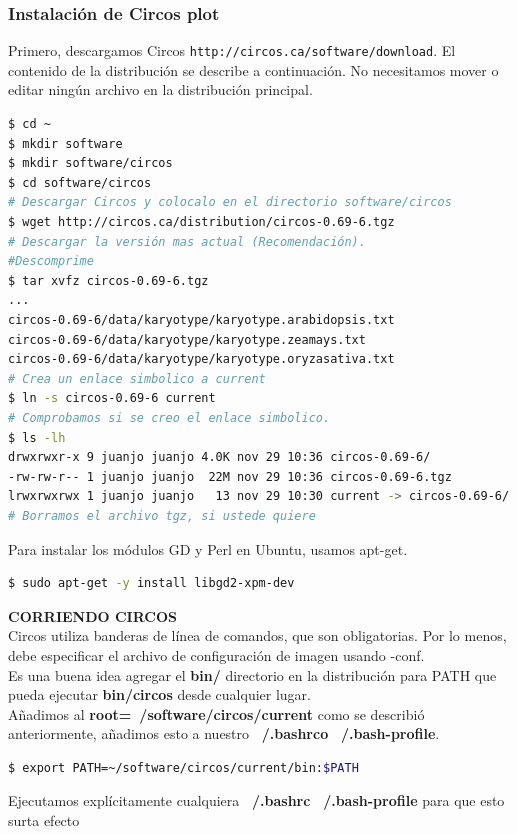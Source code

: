 \documentclass[12pt,letterpaper]{article}
\begin{document}
\subsubsection{Instalación de Circos plot }
Primero, descargamos Circos \texttt{http://circos.ca/software/download}. El contenido de la distribución se describe a continuación.
No necesitamos mover o editar ningún archivo en la distribución principal.
\begin{lstlisting}[language=bash,caption={Suponiendo que desea instalar en ROOT=~/software/circos},style=consola]
$ cd ~
$ mkdir software
$ mkdir software/circos
$ cd software/circos
# Descargar Circos y colocalo en el directorio software/circos
$ wget http://circos.ca/distribution/circos-0.69-6.tgz
# Descargar la versión mas actual (Recomendación).
#Descomprime 
$ tar xvfz circos-0.69-6.tgz
...
circos-0.69-6/data/karyotype/karyotype.arabidopsis.txt
circos-0.69-6/data/karyotype/karyotype.zeamays.txt
circos-0.69-6/data/karyotype/karyotype.oryzasativa.txt
# Crea un enlace simbolico a current 
$ ln -s circos-0.69-6 current
# Comprobamos si se creo el enlace simbolico.
$ ls -lh
drwxrwxr-x 9 juanjo juanjo 4.0K nov 29 10:36 circos-0.69-6/
-rw-rw-r-- 1 juanjo juanjo  22M nov 29 10:36 circos-0.69-6.tgz
lrwxrwxrwx 1 juanjo juanjo   13 nov 29 10:30 current -> circos-0.69-6/
# Borramos el archivo tgz, si ustede quiere
\end{lstlisting}
Para instalar los módulos GD y Perl en Ubuntu, usamos apt-get.\\
\begin{lstlisting}[language=bash, style=consola]
$ sudo apt-get -y install libgd2-xpm-dev
\end{lstlisting}
\textbf{CORRIENDO CIRCOS}\\ 
Circos utiliza banderas de línea de comandos, que son obligatorias. Por lo menos, debe especificar el archivo de configuración de imagen usando -conf.\\
Es una buena idea agregar el \textbf{bin/} directorio en la distribución para PATH que pueda ejecutar \textbf{bin/circos} desde cualquier lugar.\\
Añadimos al \textbf{root=~/software/circos/current} como se describió anteriormente, añadimos esto a nuestro \textbf{~/.bashrco} \textbf{~/.bash-profile}.\\ 
\begin{lstlisting}[language=bash, style=consola]
$ export PATH=~/software/circos/current/bin:$PATH
\end{lstlisting}
Ejecutamos explícitamente cualquiera \textbf{~/.bashrc} \textbf{~/.bash-profile} para que esto surta efecto\\
\end{document}
